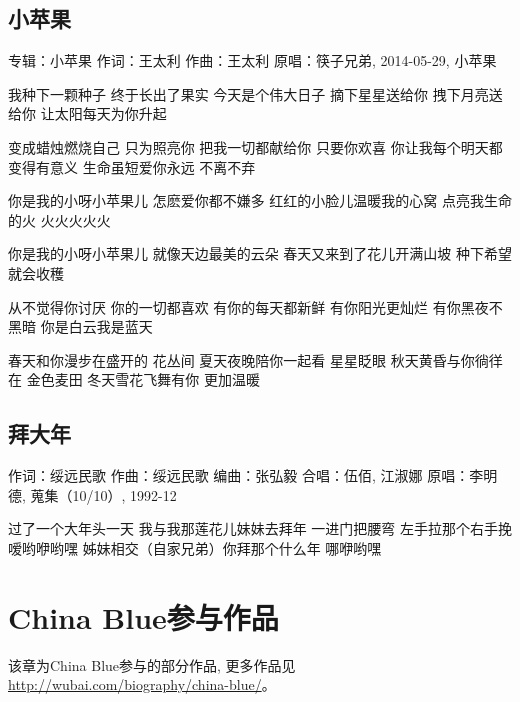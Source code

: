 \documentclass[UTF8,a4paper,oneside,twocolumn,12pt]{ctexbook}
\newcommand{\infopair}[2]{\textbullet #1：#2}
\newcommand{\zc}[1][伍佰]{\infopair{作词}{#1}}
\newcommand{\zq}[1][伍佰]{\infopair{作曲}{#1}}
\newcommand{\bq}[1][伍佰]{\infopair{编曲}{#1}}
\newcommand{\zj}[1]{\infopair{专辑}{#1}}
\newcommand{\yc}[1]{\infopair{原唱}{#1}}
\newcommand{\sj}[1]{\infopair{时间}{#1}}
\newenvironment{info}{\begin{flushleft}\kaishu
	}
	{\end{flushleft}\normalsize\yahei\par}
\newenvironment{lyric}{
	}
{}
\begin{document}
\section{小苹果}
\begin{info}
	\zj{小苹果}
	\zc[王太利]
	\zq[王太利]
	\yc{筷子兄弟, 2014-05-29, 小苹果}
\end{info}
\begin{lyric}
	我种下一颗种子 终于长出了果实
	今天是个伟大日子
	摘下星星送给你 拽下月亮送给你
	让太阳每天为你升起

	变成蜡烛燃烧自己 只为照亮你
	把我一切都献给你 只要你欢喜
	你让我每个明天都 变得有意义
	生命虽短爱你永远 不离不弃

	你是我的小呀小苹果儿
	怎麽爱你都不嫌多
	红红的小脸儿温暖我的心窝
	点亮我生命的火 火火火火火

	你是我的小呀小苹果儿
	就像天边最美的云朵
	春天又来到了花儿开满山坡
	种下希望就会收穫

	从不觉得你讨厌 你的一切都喜欢
	有你的每天都新鲜
	有你阳光更灿烂 有你黑夜不黑暗
	你是白云我是蓝天

	春天和你漫步在盛开的 花丛间
	夏天夜晚陪你一起看 星星眨眼
	秋天黄昏与你徜徉在 金色麦田
	冬天雪花飞舞有你 更加温暖
\end{lyric}

\section{拜大年}%
\begin{info}
	\zc[绥远民歌]%
	\zq[绥远民歌]
	\bq[张弘毅]
	\infopair{合唱}{伍佰, 江淑娜}
	\yc{李明德, 蒐集（10/10）, 1992-12}
\end{info}
\begin{lyric}
	过了一个大年头一天
	我与我那莲花儿妹妹去拜年
	一进门把腰弯
	左手拉那个右手挽
	嗳哟咿哟嘿
	姊妹相交（自家兄弟）你拜那个什么年
	哪咿哟嘿
\end{lyric}

\chapter{China Blue参与作品}
该章为China Blue参与的部分作品, 更多作品见 \url{http://wubai.com/biography/china-blue/}。%
\end{document}

